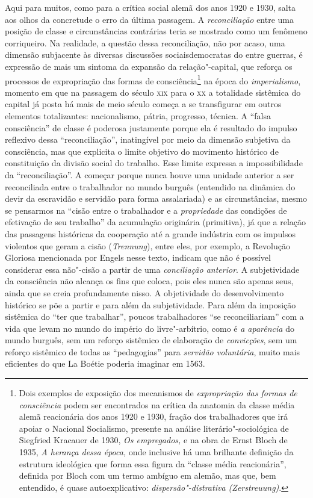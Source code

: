 Aqui para muitos, como para a crítica social alemã dos anos 1920 e 1930,
salta aos olhos da concretude o erro da última passagem. A
\emph{reconciliação} entre uma posição de classe e circunstâncias
contrárias teria se mostrado como um fenômeno corriqueiro. Na realidade,
a questão dessa reconciliação, não por acaso, uma dimensão subjacente às
diversas discussões sociaisdemocratas do entre guerras, é expressão de
mais um sintoma da expansão da relação"-capital, que reforça os
processos de expropriação das formas de consciência\footnote{Dois
  exemplos de exposição dos mecanismos de \emph{expropriação das formas
  de consciência} podem ser encontrados na crítica da anatomia da classe
  média alemã reacionária dos anos 1920 e 1930, fração dos trabalhadores
  que irá apoiar o Nacional Socialismo, presente na análise
  literário"-sociológica de Siegfried Kracauer de 1930, \emph{Os
  empregados,} e na obra de Ernst Bloch de 1935, \emph{A herança dessa
  época,} onde inclusive há uma brilhante definição da estrutura
  ideológica que forma essa figura da ``classe média reacionária'',
  definida por Bloch com um termo ambíguo em alemão, mas que, bem
  entendido, é quase autoexplicativo: \emph{dispersão"-distrativa
  (Zerstreuung)}.} na época do \emph{imperialismo}, momento em que na
passagem do século \textsc{xix} para o \textsc{xx} a totalidade
sistêmica do capital já posta há mais de meio século começa a se
transfigurar em outros elementos totalizantes: nacionalismo, pátria,
progresso, técnica. A ``falsa consciência'' de classe é poderosa
justamente porque ela é resultado do impulso reflexivo dessa
``reconciliação'', inatingível por meio da dimensão subjetiva da
consciência, mas que explicita o limite objetivo do movimento histórico
de constituição da divisão social do trabalho. Esse limite expressa a
impossibilidade da ``reconciliação''. A começar porque nunca houve uma
unidade anterior a ser reconciliada entre o trabalhador no mundo burguês
(entendido na dinâmica do devir da escravidão e servidão para forma
assalariada) e as circunstâncias, mesmo se pensarmos na ``cisão entre o
trabalhador e a \emph{propriedade} das condições de efetivação de seu
trabalho'' da acumulação originária (primitiva), já que a relação das
passagens históricas da cooperação até a grande indústria com os
impulsos violentos que geram a cisão (\emph{Trennung}), entre eles, por
exemplo, a Revolução Gloriosa mencionada por Engels nesse texto, indicam
que não é possível considerar essa não"-cisão a partir de uma
\emph{conciliação anterior}. A subjetividade da consciência não alcança
os fins que coloca, pois eles nunca são apenas seus, ainda que se creia
profundamente nisso. A objetividade do desenvolvimento histórico se põe
a partir e para além da subjetividade. Para além da imposição sistêmica
do ``ter que trabalhar'', poucos trabalhadores ``se reconciliariam'' com
a vida que levam no mundo do império do livre"-arbítrio, como é \emph{a
aparência} do mundo burguês, sem um reforço sistêmico de elaboração de
\emph{convicções}, sem um reforço sistêmico de todas as ``pedagogias''
para \emph{servidão voluntária}, muito mais eficientes do que La Boétie
poderia imaginar em 1563.

